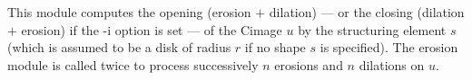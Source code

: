 This module computes the opening (erosion $+$ dilation) --- or the closing 
(dilation $+$ erosion) if the -i option is set ---
of the Cimage $u$ by the structuring element $s$ (which is assumed to
be a disk of radius $r$ if no shape $s$ is specified).
The {\sf erosion} module is called twice to process successively
$n$ erosions and $n$ dilations on $u$.

